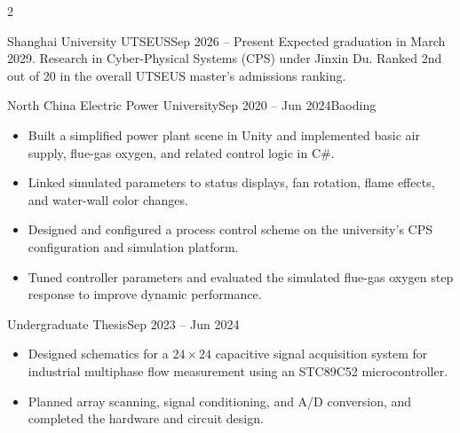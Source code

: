 \documentclass[10pt,a4paper,withhyper,normalphoto]{altacv}
\begin{document}
\makecvheader

\begin{paracol}{2}


  {Shanghai University \textbar{} UTSEUS}{Sep 2026 -- Present}{}
Expected graduation in March 2029. Research in Cyber-Physical Systems (CPS)
under Jinxin Du. Ranked 2nd out of 20 in the overall UTSEUS master's admissions ranking.

\divider

  {North China Electric Power University}{Sep 2020 -- Jun 2024}{Baoding}


\begin{itemize}
  \item Built a simplified power plant scene in Unity and implemented basic air supply,
    flue-gas oxygen, and related control logic in C\#.
  \item Linked simulated parameters to status displays, fan rotation, flame effects,
    and water-wall color changes.
\end{itemize}

\divider

\begin{itemize}
  \item Designed and configured a process control scheme on the university's
    CPS configuration and simulation platform.
  \item Tuned controller parameters and evaluated the simulated flue-gas oxygen
    step response to improve dynamic performance.
\end{itemize}

\divider

  {Undergraduate Thesis}{Sep 2023 -- Jun 2024}{}
\begin{itemize}
  \item Designed schematics for a \(24 \times 24\) capacitive signal acquisition system
    for industrial multiphase flow measurement using an STC89C52 microcontroller.
  \item Planned array scanning, signal conditioning, and A/D conversion, and completed
    the hardware and circuit design.
\end{itemize}


\end{paracol}
\end{document}
